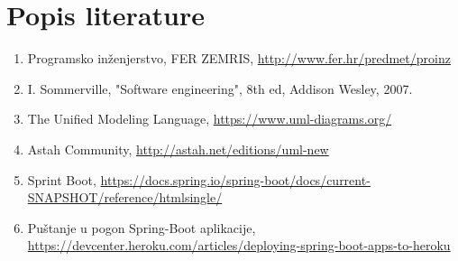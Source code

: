 \chapter*{Popis literature}
		
		\begin{enumerate}
			
			
			\item  Programsko inženjerstvo, FER ZEMRIS, \url{http://www.fer.hr/predmet/proinz}
			
			\item  I. Sommerville, "Software engineering", 8th ed, Addison Wesley, 2007.
			
			
			\item  The Unified Modeling Language, \url{https://www.uml-diagrams.org/}
			
			\item  Astah Community, \url{http://astah.net/editions/uml-new}
			
			\item Sprint Boot, \url{https://docs.spring.io/spring-boot/docs/current-SNAPSHOT/reference/htmlsingle/}
			
			\item Puštanje u pogon Spring-Boot aplikacije, \url{https://devcenter.heroku.com/articles/deploying-spring-boot-apps-to-heroku}
		\end{enumerate}
		
		 
